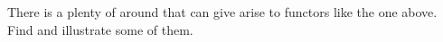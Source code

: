 
\begin{exercise}
  There is a plenty of  around that can give arise to
  functors like the one above. Find and illustrate some of them.
\end{exercise}

